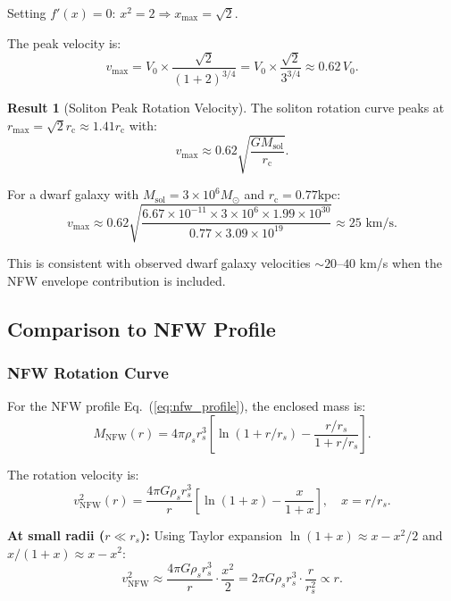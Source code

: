 \documentclass[11pt,a4paper]{article}
\newcommand{\ee}[1]{\times 10^{#1}}
\newcommand{\Msun}{\ensuremath{M_\odot}}
\newcommand{\Msol}{\ensuremath{M_{\mathrm{sol}}}}
\newcommand{\kpc}{\ensuremath{\mathrm{kpc}}}
\newcommand{\rc}{\ensuremath{r_{\mathrm{c}}}}
\theoremstyle{definition}
\newtheorem{result}{Result}[section]
\theoremstyle{remark}
\begin{document}
Setting $f'(x) = 0$: $x^2 = 2 \Rightarrow x_{\max} = \sqrt{2}$.

The peak velocity is:
\begin{equation}
v_{\max} = V_0 \times \frac{\sqrt{2}}{(1+2)^{3/4}} = V_0 \times \frac{\sqrt{2}}{3^{3/4}} \approx 0.62 \, V_0.
\end{equation}

\begin{result}[Soliton Peak Rotation Velocity]
The soliton rotation curve peaks at $r_{\max} = \sqrt{2}\rc \approx 1.41\rc$ with:
\begin{equation}
\boxed{v_{\max} \approx 0.62 \sqrt{\frac{G\Msol}{\rc}}.}
\end{equation}

For a dwarf galaxy with $\Msol = 3 \times 10^6 \Msun$ and $\rc = 0.77 \kpc$:
\begin{equation}
v_{\max} \approx 0.62 \sqrt{\frac{6.67\ee{-11} \times 3\ee{6} \times 1.99\ee{30}}{0.77 \times 3.09\ee{19}}} \approx 25 \text{ km/s}.
\end{equation}

This is consistent with observed dwarf galaxy velocities $\sim 20$--$40$ km/s when the NFW envelope contribution is included.
\end{result}

\subsection{Comparison to NFW Profile}
\label{sec:NFW_comparison}

\subsubsection{NFW Rotation Curve}

For the NFW profile Eq.~(\ref{eq:nfw_profile}), the enclosed mass is:
\begin{equation}
M_{\mathrm{NFW}}(r) = 4\pi \rho_s r_s^3 \left[\ln(1 + r/r_s) - \frac{r/r_s}{1 + r/r_s}\right].
\end{equation}

The rotation velocity is:
\begin{equation}
v_{\mathrm{NFW}}^2(r) = \frac{4\pi G \rho_s r_s^3}{r}\left[\ln(1 + x) - \frac{x}{1+x}\right], \quad x = r/r_s.
\end{equation}

\textbf{At small radii ($r \ll r_s$):} Using Taylor expansion $\ln(1+x) \approx x - x^2/2$ and $x/(1+x) \approx x - x^2$:
\begin{equation}
v_{\mathrm{NFW}}^2 \approx \frac{4\pi G\rho_s r_s^3}{r} \cdot \frac{x^2}{2} = 2\pi G\rho_s r_s^3 \cdot \frac{r}{r_s^2} \propto r.
\end{equation}
\end{document}

